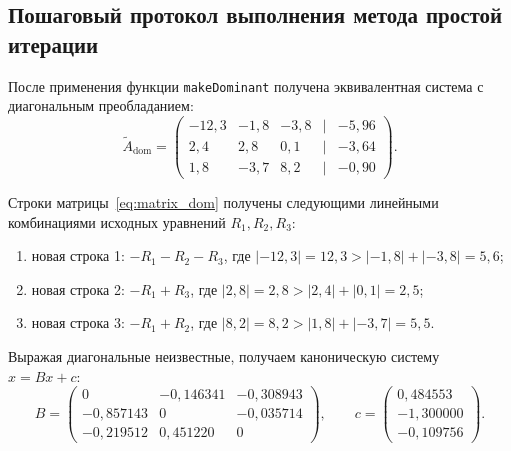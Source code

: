 \begin{listing}[H]
    \caption{Итерационный цикл с двумя одномерными массивами в функции task2}
    \label{lst:code-task2-loop}
\end{listing}

\subsection{Пошаговый протокол выполнения метода простой итерации}

После применения функции \texttt{makeDominant} получена эквивалентная система с диагональным преобладанием:
\begin{equation}
    \widetilde{A}_{\text{dom}} = \begin{pmatrix}
        -12{,}3 & -1{,}8 & -3{,}8 & | & -5{,}96 \\
        2{,}4 & 2{,}8 & 0{,}1 & | & -3{,}64 \\
        1{,}8 & -3{,}7 & 8{,}2 & | & -0{,}90
    \end{pmatrix}.
    \label{eq:matrix_dom}
\end{equation}

Строки матрицы~\eqref{eq:matrix_dom} получены следующими линейными комбинациями исходных уравнений $R_1, R_2, R_3$:
\begin{enumerate}
    \item новая строка 1: $-R_1 - R_2 - R_3$, где $|-12{,}3| = 12{,}3 > |-1{,}8| + |-3{,}8| = 5{,}6$;
    \item новая строка 2: $-R_1 + R_3$, где $|2{,}8| = 2{,}8 > |2{,}4| + |0{,}1| = 2{,}5$;
    \item новая строка 3: $-R_1 + R_2$, где $|8{,}2| = 8{,}2 > |1{,}8| + |-3{,}7| = 5{,}5$.
\end{enumerate}

Выражая диагональные неизвестные, получаем каноническую систему $x = Bx + c$:
\begin{equation}
    B = \begin{pmatrix}
        0 & -0{,}146341 & -0{,}308943 \\
        -0{,}857143 & 0 & -0{,}035714 \\
        -0{,}219512 & 0{,}451220 & 0
    \end{pmatrix},
    \qquad
    c = \begin{pmatrix}
        0{,}484553 \\
        -1{,}300000 \\
        -0{,}109756
    \end{pmatrix}.
\end{equation}

